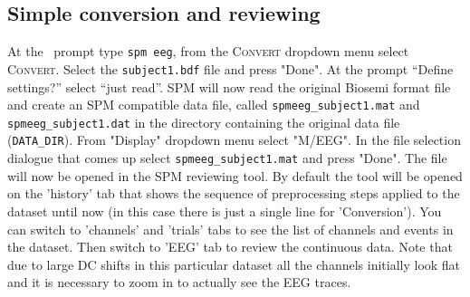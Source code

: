 \subsection{Simple conversion and reviewing}

At the \matlab\ prompt type \texttt{spm eeg}, from the \textsc{Convert} dropdown menu  select \textsc{Convert}. Select the \texttt{subject1.bdf} file and press "Done". At the prompt ``Define settings?'' select ``just read''. SPM will now read the original Biosemi format file and create an SPM compatible data file, called \texttt{spmeeg\_subject1.mat} and \texttt{spmeeg\_subject1.dat} in the directory containing the original data file (\texttt{DATA\_DIR}). From "Display" dropdown menu select "M/EEG". In the file selection dialogue that comes up select \texttt{spmeeg\_subject1.mat} and press "Done". The file will now be opened in the SPM reviewing tool. By default the tool will be opened on the 'history' tab that shows the sequence of preprocessing steps applied to the dataset until now (in this case there is just a single line for 'Conversion'). You can switch to 'channels' and 'trials' tabs to see the list of channels and events in  the dataset. Then switch to 'EEG' tab to review the continuous data. Note that due to large DC shifts in this particular dataset all the channels initially look flat and it is necessary to zoom in to actually see the EEG traces.


